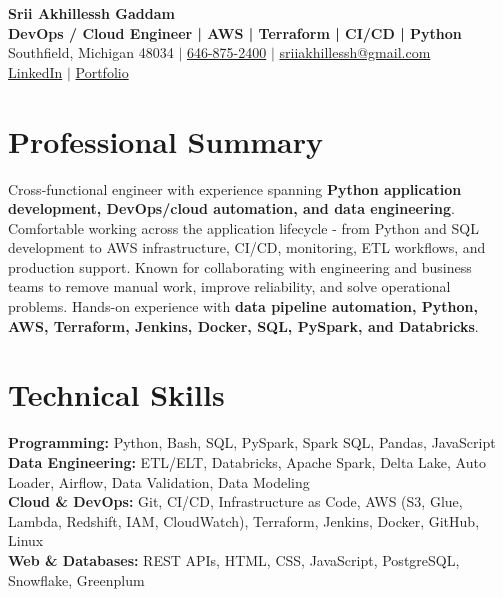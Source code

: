 \documentclass[letterpaper,10pt]{article}
\begin{document}
\fontsize{9.35pt}{10.45pt}\selectfont

\begin{center}
    {\LARGE \textbf{Srii Akhillessh Gaddam}} \\[-1pt]
    \textbf{DevOps / Cloud Engineer | AWS | Terraform | CI/CD | Python} \\[2pt]
    Southfield, Michigan 48034 $|$
    \href{tel:6468752400}{646-875-2400} $|$
    \href{mailto:sriiakhillessh@gmail.com}{sriiakhillessh@gmail.com} \\[1pt]
    \href{https://www.linkedin.com/in/srii-akhiilessh-gaddam-b48668191/}{LinkedIn} $|$
    \href{https://sriiakhillesshg.github.io/portfolio/}{Portfolio}
\end{center}
\vspace{-8pt}

\section{Professional Summary}
\small{Cross-functional engineer with experience spanning \textbf{Python application development, DevOps/cloud automation, and data engineering}. Comfortable working across the application lifecycle - from Python and SQL development to AWS infrastructure, CI/CD, monitoring, ETL workflows, and production support. Known for collaborating with engineering and business teams to remove manual work, improve reliability, and solve operational problems. Hands-on experience with \textbf{data pipeline automation, Python, AWS, Terraform, Jenkins, Docker, SQL, PySpark, and Databricks}.}

\section{Technical Skills}
\small{
\textbf{Programming:} Python, Bash, SQL, PySpark, Spark SQL, Pandas, JavaScript \\
\textbf{Data Engineering:} ETL/ELT, Databricks, Apache Spark, Delta Lake, Auto Loader, Airflow, Data Validation, Data Modeling \\
\textbf{Cloud \& DevOps:} Git, CI/CD, Infrastructure as Code, AWS (S3, Glue, Lambda, Redshift, IAM, CloudWatch), Terraform, Jenkins, Docker, GitHub, Linux \\
\textbf{Web \& Databases:} REST APIs, HTML, CSS, JavaScript, PostgreSQL, Snowflake, Greenplum
}
\end{document}
